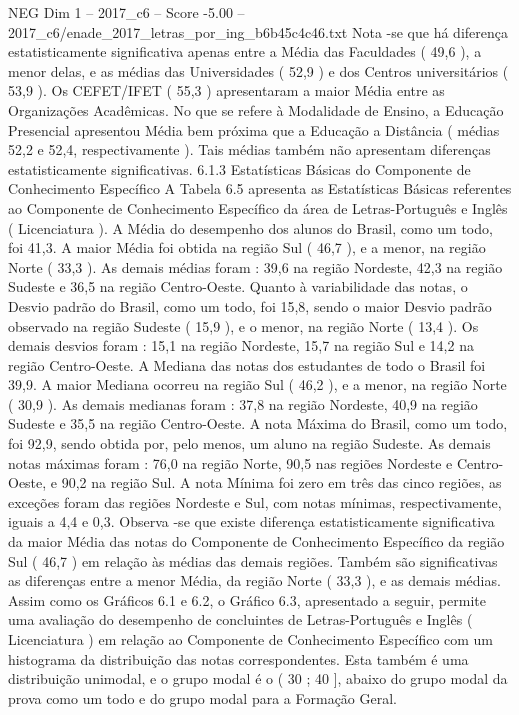 \begin{textsample}{NEG Dim 1 – 2017\_c6 – Score -5.00 – 2017\_c6/enade\_2017\_letras\_por\_ing\_b6b45c4c46.txt}
Nota -se que há diferença estatisticamente significativa apenas entre a Média das Faculdades ( 49,6 ), a menor delas, e as médias das Universidades ( 52,9 ) e dos Centros universitários ( 53,9 ).
Os CEFET/IFET ( 55,3 ) apresentaram a maior Média entre as Organizações Acadêmicas.
No que se refere à Modalidade de Ensino, a Educação Presencial apresentou Média bem próxima que a Educação a Distância ( médias 52,2 e 52,4, respectivamente ).
Tais médias também não apresentam diferenças estatisticamente significativas. 6.1.3 Estatísticas Básicas do Componente de Conhecimento Específico A Tabela 6.5 apresenta as Estatísticas Básicas referentes ao Componente de Conhecimento Específico da área de Letras-Português e Inglês ( Licenciatura ).
A Média do desempenho dos alunos do Brasil, como um todo, foi 41,3.
A maior Média foi obtida na região Sul ( 46,7 ), e a menor, na região Norte ( 33,3 ).
As demais médias foram : 39,6 na região Nordeste, 42,3 na região Sudeste e 36,5 na região Centro-Oeste.
Quanto à variabilidade das notas, o Desvio padrão do Brasil, como um todo, foi 15,8, sendo o maior Desvio padrão observado na região Sudeste ( 15,9 ), e o menor, na região Norte ( 13,4 ).
Os demais desvios foram : 15,1 na região Nordeste, 15,7 na região Sul e 14,2 na região Centro-Oeste.
A Mediana das notas dos estudantes de todo o Brasil foi 39,9.
A maior Mediana ocorreu na região Sul ( 46,2 ), e a menor, na região Norte ( 30,9 ).
As demais medianas foram : 37,8 na região Nordeste, 40,9 na região Sudeste e 35,5 na região Centro-Oeste.
A nota Máxima do Brasil, como um todo, foi 92,9, sendo obtida por, pelo menos, um aluno na região Sudeste.
As demais notas máximas foram : 76,0 na região Norte, 90,5 nas regiões Nordeste e Centro-Oeste, e 90,2 na região Sul.
A nota Mínima foi zero em três das cinco regiões, as exceções foram das regiões Nordeste e Sul, com notas mínimas, respectivamente, iguais a 4,4 e 0,3.
Observa -se que existe diferença estatisticamente significativa da maior Média das notas do Componente de Conhecimento Específico da região Sul ( 46,7 ) em relação às médias das demais regiões.
Também são significativas as diferenças entre a menor Média, da região Norte ( 33,3 ), e as demais médias.
Assim como os Gráficos 6.1 e 6.2, o Gráfico 6.3, apresentado a seguir, permite uma avaliação do desempenho de concluintes de Letras-Português e Inglês ( Licenciatura ) em relação ao Componente de Conhecimento Específico com um histograma da distribuição das notas correspondentes.
Esta também é uma distribuição unimodal, e o grupo modal é o ( 30 ; 40 ], abaixo do grupo modal da prova como um todo e do grupo modal para a Formação Geral.

\end{textsample}
